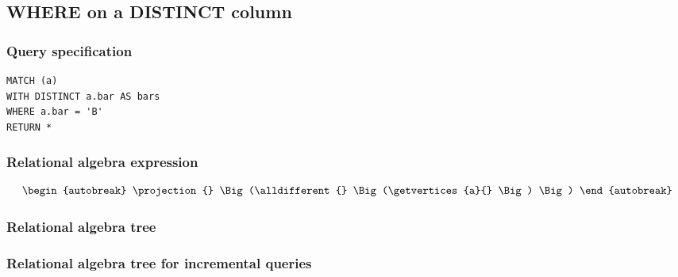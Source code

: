 \subsection{WHERE on a DISTINCT column}

\subsubsection*{Query specification}

\begin{lstlisting}
MATCH (a)
WITH DISTINCT a.bar AS bars
WHERE a.bar = 'B'
RETURN *
\end{lstlisting}

\subsubsection*{Relational algebra expression}

\begin{align*}
\begin{autobreak}
\projection{} \Big(\alldifferent{} \Big(\getvertices{a}{}
\Big)
\Big)
\end{autobreak}
\end{align*}

\subsubsection*{Relational algebra tree}


\subsubsection*{Relational algebra tree for incremental queries}


